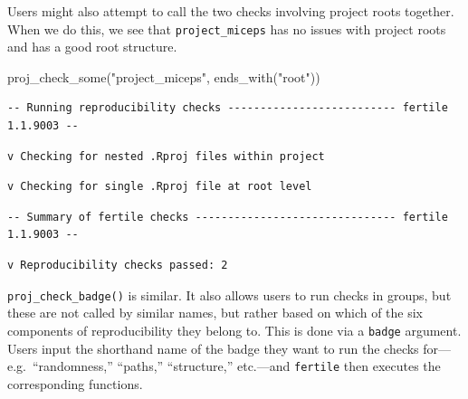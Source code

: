 \documentclass[12pt,twoside]{reedthesis}
\newenvironment{Shaded}{\begin{snugshade}}{\end{snugshade}}
\newcommand{\FunctionTok}[1]{\textcolor[rgb]{0.00,0.00,0.00}{#1}}
\newcommand{\NormalTok}[1]{#1}
\newcommand{\StringTok}[1]{\textcolor[rgb]{0.31,0.60,0.02}{#1}}
\begin{document}
Users might also attempt to call the two checks involving project roots together. When we do this, we see that \texttt{project\_miceps} has no issues with project roots and has a good root structure.
\begin{Shaded}
\begin{Highlighting}[]
\FunctionTok{proj\_check\_some}\NormalTok{(}\StringTok{"project\_miceps"}\NormalTok{, }\FunctionTok{ends\_with}\NormalTok{(}\StringTok{"root"}\NormalTok{))}
\end{Highlighting}
\end{Shaded}
\footnotesize
\begin{verbatim}
-- Running reproducibility checks -------------------------- fertile 1.1.9003 --
\end{verbatim}
\begin{verbatim}
v Checking for nested .Rproj files within project
\end{verbatim}
\begin{verbatim}
v Checking for single .Rproj file at root level
\end{verbatim}
\begin{verbatim}
-- Summary of fertile checks ------------------------------- fertile 1.1.9003 --
\end{verbatim}
\begin{verbatim}
v Reproducibility checks passed: 2
\end{verbatim}
\normalsize

\texttt{proj\_check\_badge()} is similar. It also allows users to run checks in groups, but these are not called by similar names, but rather based on which of the six components of reproducibility they belong to. This is done via a \texttt{badge} argument. Users input the shorthand name of the badge they want to run the checks for---e.g.~``randomness,'' ``paths,'' ``structure,'' etc.---and \texttt{fertile} then executes the corresponding functions.
\end{document}
